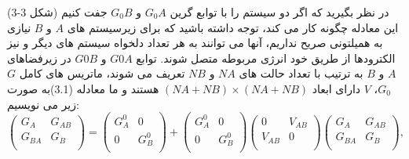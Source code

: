 در نظر بگیرید که اگر دو سیستم را با توابع گرین $G_0 A$ و $G_0B$ جفت کنیم (شکل 3-3) این معادله چگونه کار می کند، توجه داشته باشید که برای زیرسیستم های $A$ و $B$ نیازی به همیلتونی صریح نداریم، آنها می توانند به هر تعداد دلخواه سیستم های دیگر و نیز الکترودها از طریق خود انرژی مربوطه متصل شوند. توابع $G0A$ و $G0B$ در زیرفضاهای $A$ و $B$ به ترتیب با تعداد حالت های $NA$ و $NB$ تعریف می شوند، ماتریس های کامل $G$ $G_0$، $V$ دارای ابعاد $(NA + NB) \times (NA + NB)$ هستند و ما معادله (3.1)به صورت زیر می نویسیم:
\begin{equation}
    \left( \begin{matrix}
           {{G}_{A}} & {{G}_{AB}}  \\
           {{G}_{BA}} & {{G}_{B}}  \\
        \end{matrix} \right)=\left( \begin{matrix}
           G_{A}^{0} & 0  \\
           0 & G_{B}^{0}  \\
        \end{matrix} \right)+\left( \begin{matrix}
           G_{A}^{0} & 0  \\
           0 & G_{B}^{0}  \\
        \end{matrix} \right)\left( \begin{matrix}
           0 & {{V}_{AB}}  \\
           {{V}_{AB}} & 0  \\
        \end{matrix} \right)\left( \begin{matrix}
           {{G}_{A}} & {{G}_{AB}}  \\
           {{G}_{BA}} & {{G}_{B}}  \\
        \end{matrix} \right),
\end{equation}

